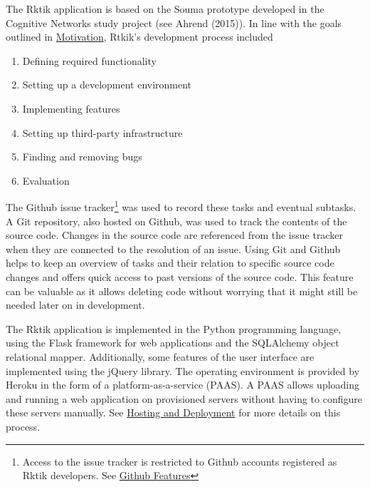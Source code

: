 
The Rktik application is based on the Souma prototype developed in the
Cognitive Networks study project (see Ahrend (2015)). In line with the
goals outlined in \hyperref[motivation]{Motivation}, Rtkik's development
process included

\begin{enumerate}
\def\labelenumi{\arabic{enumi}.}
\tightlist
\item
  Defining required functionality
\item
  Setting up a development environment
\item
  Implementing features
\item
  Setting up third-party infrastructure
\item
  Finding and removing bugs
\item
  Evaluation
\end{enumerate}

The Github issue tracker\footnote{Access to the issue tracker is
  restricted to Github accounts registered as Rktik developers. See
  \href{https://github.com/features}{Github Features}} was used to
record these tasks and eventual subtasks. A Git repository, also hosted
on Github, was used to track the contents of the source code. Changes in
the source code are referenced from the issue tracker when they are
connected to the resolution of an issue. Using Git and Github helps to
keep an overview of tasks and their relation to specific source code
changes and offers quick access to past versions of the source code.
This feature can be valuable as it allows deleting code without worrying
that it might still be needed later on in development.

The Rktik application is implemented in the Python programming language,
using the Flask framework for web applications and the SQLAlchemy object
relational mapper. Additionally, some features of the user interface are
implemented using the jQuery library. The operating environment is
provided by Heroku in the form of a platform-as-a-service (PAAS). A PAAS
allows uploading and running a web application on provisioned servers
without having to configure these servers manually. See
\hyperref[hosting-and-deployment]{Hosting and Deployment} for more
details on this process.

